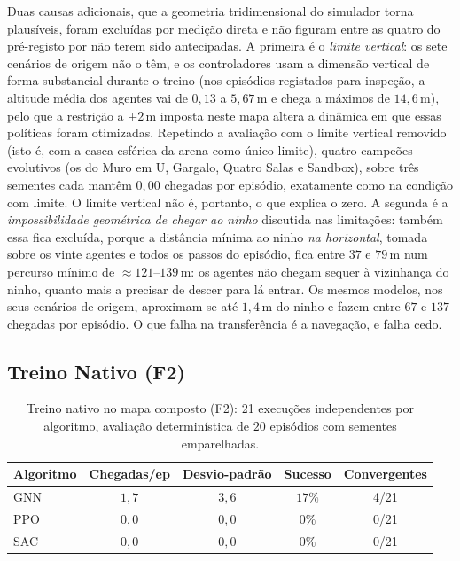Duas causas adicionais, que a geometria tridimensional do simulador torna
plausíveis, foram excluídas por medição direta e não figuram entre as quatro do
pré-registo por não terem sido antecipadas. A primeira é o \emph{limite
vertical}: os sete cenários de origem não o têm, e os controladores usam a
dimensão vertical de forma substancial durante o treino (nos episódios
registados para inspeção, a altitude média dos agentes vai de $0{,}13$ a
$5{,}67$\,m e chega a máximos de $14{,}6$\,m), pelo que a restrição a
$\pm 2$\,m imposta neste mapa altera a dinâmica em que essas políticas foram
otimizadas. Repetindo a avaliação com o limite vertical removido (isto é, com a
casca esférica da arena como único limite), quatro campeões evolutivos (os do
Muro em U, Gargalo, Quatro Salas e Sandbox), sobre três sementes cada mantêm
$0{,}00$ chegadas por episódio, exatamente como na condição com limite. O limite
vertical não é, portanto, o que explica o zero. A segunda é a
\emph{impossibilidade geométrica de chegar ao ninho} discutida nas limitações: também
essa fica excluída, porque a distância mínima ao ninho \emph{na horizontal},
tomada sobre os vinte agentes e todos os passos do episódio, fica entre $37$ e
$79$\,m num percurso mínimo de $\approx 121$--$139$\,m: os agentes não chegam sequer à
vizinhança do ninho, quanto mais a precisar de descer para lá entrar. Os mesmos
modelos, nos seus cenários de origem, aproximam-se até $1{,}4$\,m do ninho e
fazem entre $67$ e $137$ chegadas por episódio. O que falha na transferência é a
navegação, e falha cedo.

\subsection{Treino Nativo (F2)}

\begin{table}[!htbp]
\centering
\caption[Treino nativo no mapa composto (F2)]{Treino nativo no mapa composto (F2): 21 execuções independentes por algoritmo, avaliação determinística de $20$ episódios com sementes emparelhadas.}
\label{tab:f2_mapa_grande}
\begin{tabular}{lcccc}
\hline
\textbf{Algoritmo} & \textbf{Chegadas/ep} & \textbf{Desvio-padrão} & \textbf{Sucesso} & \textbf{Convergentes} \\
\hline
GNN & $1{,}7$ & $3{,}6$ & $17\%$ & 4/21 \\
PPO & $0{,}0$ & $0{,}0$ & $0\%$ & 0/21 \\
SAC & $0{,}0$ & $0{,}0$ & $0\%$ & 0/21 \\
\hline
\end{tabular}
\end{table}

